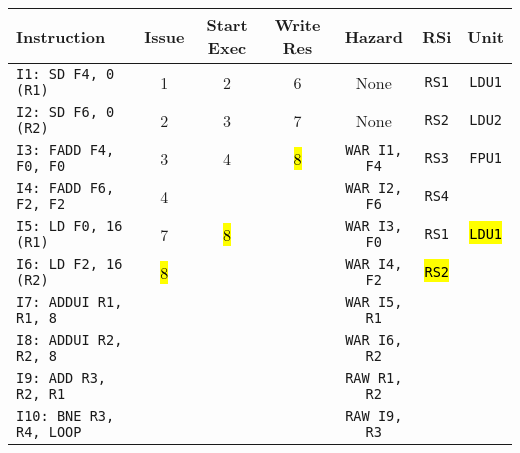 \begin{enumerate}
    \begin{table}[!htp]
        \centering
        \begin{adjustbox}{width={\textwidth},totalheight={\textheight},keepaspectratio}
        \begin{tabular}{@{} l c c c c c c @{}}
            \toprule
            \textbf{Instruction} & \textbf{Issue} & \textbf{Start Exec} & \textbf{Write Res} & \textbf{Hazard} & \textbf{RSi} & \textbf{Unit} \\
            \midrule
            \texttt{I1: SD F4, 0 (R1)}      & 1 & 2 & 6 & None  & \texttt{RS1}   & \texttt{LDU1}  \\ [.5em]
            \texttt{I2: SD F6, 0 (R2)}      & 2 & 3 & 7 & None  & \texttt{RS2}   & \texttt{LDU2}  \\ [.5em]
            \texttt{I3: FADD F4, F0, F0}    & 3 & 4 & \hl{8} & \texttt{WAR I1, F4}  & \texttt{RS3} & \texttt{FPU1} \\ [.5em]
            \texttt{I4: FADD F6, F2, F2}    & 4 &   &   & \texttt{WAR I2, F6} & \texttt{RS4} &       \\ [.5em]
            \texttt{I5: LD F0, 16 (R1)}     & 7 & \hl{8} &   & \texttt{WAR I3, F0} & \texttt{RS1} & \hl{\texttt{LDU1}} \\ [.5em]
            \texttt{I6: LD F2, 16 (R2)}     & \hl{8} &   &   & \texttt{WAR I4, F2} & \hl{\texttt{RS2}} &       \\ [.5em]
            \texttt{I7: ADDUI R1, R1, 8}    &   &   &   & \texttt{WAR I5, R1} &       &       \\ [.5em]
            \texttt{I8: ADDUI R2, R2, 8}    &   &   &   & \texttt{WAR I6, R2} &       &       \\ [.5em]
            \texttt{I9: ADD R3, R2, R1}     &   &   &   & \texttt{RAW R1, R2} &       &       \\ [.5em]
            \texttt{I10: BNE R3, R4, LOOP}   &   &   &   & \texttt{RAW I9, R3} &       &       \\
            \bottomrule
        \end{tabular}
        \end{adjustbox}
    \end{table}
    

\end{enumerate}
